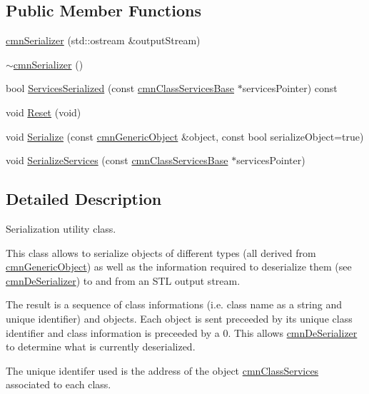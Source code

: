 \subsection*{Public Member Functions}
\begin{DoxyCompactItemize}
\item 
\hyperlink{classcmn_serializer_a5d6d5a3dbf7e90f2bb187564c31dd72e}{cmn\+Serializer} (std\+::ostream \&output\+Stream)
\item 
\hyperlink{classcmn_serializer_a02941ff3aaf78477e281c8510b8824c0}{$\sim$cmn\+Serializer} ()
\item 
bool \hyperlink{classcmn_serializer_a731785a2b18be7dff2dee525efdda9ba}{Services\+Serialized} (const \hyperlink{classcmn_class_services_base}{cmn\+Class\+Services\+Base} $\ast$services\+Pointer) const 
\item 
void \hyperlink{classcmn_serializer_a03a51b502479952c7d34692895cafdb9}{Reset} (void)
\item 
void \hyperlink{classcmn_serializer_a16b44e63b25af4f6512ac8346956dd05}{Serialize} (const \hyperlink{classcmn_generic_object}{cmn\+Generic\+Object} \&object, const bool serialize\+Object=true)
\item 
void \hyperlink{classcmn_serializer_a39f03c6babcf90492cdc736307407537}{Serialize\+Services} (const \hyperlink{classcmn_class_services_base}{cmn\+Class\+Services\+Base} $\ast$services\+Pointer)
\end{DoxyCompactItemize}


\subsection{Detailed Description}
Serialization utility class.

This class allows to serialize objects of different types (all derived from \hyperlink{classcmn_generic_object}{cmn\+Generic\+Object}) as well as the information required to deserialize them (see \hyperlink{classcmn_de_serializer}{cmn\+De\+Serializer}) to and from an S\+T\+L output stream. 

The result is a sequence of class informations (i.\+e. class name as a string and unique identifier) and objects. Each object is sent preceeded by its unique class identifier and class information is preceeded by a 0. This allows \hyperlink{classcmn_de_serializer}{cmn\+De\+Serializer} to determine what is currently deserialized.

The unique identifer used is the address of the object \hyperlink{classcmn_class_services}{cmn\+Class\+Services} associated to each class.

